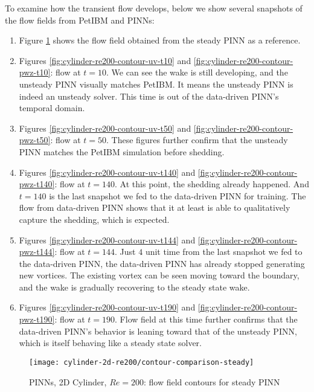To examine how the transient flow develops, below we show several snapshots of the flow fields from PetIBM and PINNs:
\begin{enumerate}
    \item Figure \ref{fig:cylinder-re200-contour-steady} shows the flow field obtained from the steady PINN as a reference.
    \item Figures \ref{fig:cylinder-re200-contour-uv-t10} and \ref{fig:cylinder-re200-contour-pwz-t10}: flow at $t=10$. We can see the wake is still developing, and the unsteady PINN visually matches PetIBM. It means the unsteady PINN is indeed an unsteady solver. This time is out of the data-driven PINN's temporal domain.
    \item Figures \ref{fig:cylinder-re200-contour-uv-t50} and \ref{fig:cylinder-re200-contour-pwz-t50}: flow at $t=50$. These figures further confirm that the unsteady PINN matches the PetIBM simulation before shedding.
    \item Figures \ref{fig:cylinder-re200-contour-uv-t140} and \ref{fig:cylinder-re200-contour-pwz-t140}: flow at $t=140$. At this point, the shedding already happened. And $t=140$ is the last snapshot we fed to the data-driven PINN for training. The flow from data-driven PINN shows that it at least is able to qualitatively capture the shedding, which is expected.
    \item Figures \ref{fig:cylinder-re200-contour-uv-t144} and \ref{fig:cylinder-re200-contour-pwz-t144}: flow at $t=144$. Just $4$ unit time from the last snapshot we fed to the data-driven PINN, the data-driven PINN has already stopped generating new vortices. The existing vortex can be seen moving toward the boundary, and the wake is gradually recovering to the steady state wake.
    \item Figures \ref{fig:cylinder-re200-contour-uv-t190} and \ref{fig:cylinder-re200-contour-pwz-t190}: flow at $t=190$. Flow field at this time further confirms that the data-driven PINN's behavior is leaning toward that of the unsteady PINN, which is itself behaving like a steady state solver.
\end{enumerate}

\begin{figure}[hbt!]
    \texttt{[image: cylinder-2d-re200/contour-comparison-steady]}
    \caption{PINNs, 2D Cylinder, $Re=200$: flow field contours for steady PINN}
    \label{fig:cylinder-re200-contour-steady}
\end{figure}

